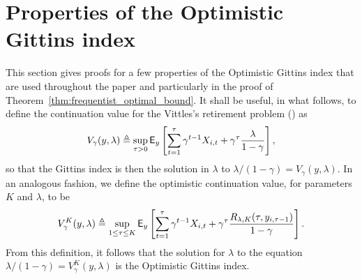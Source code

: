 %	
%	

\section{Properties of the Optimistic Gittins index}\label{sec:appendix_properties_of_ogi}
This section gives proofs for a few properties of the Optimistic Gittins index that are used throughout the paper and particularly in the proof of Theorem~\ref{thm:frequentist_optimal_bound}.  
It shall be useful, in what follows, to define the continuation value for the Vittles's retirement problem (\cite{whittle1980multi}) as
\[
V_\gamma(y, \lambda)  \triangleq \sup_{\tau > 0} \mathsf{E}_y\left[\sum_{t=1}^{\tau} \gamma^{t-1} X_{i,t} + \gamma^{\tau} \frac{\lambda}{1-\gamma}\right],
\]
so that the Gittins index is then the solution in $\lambda$ to $\lambda/(1-\gamma) = V_\gamma(y, \lambda)$. In an analogous fashion, we define the optimistic continuation value, for parameters $K$ and $\lambda$, to be
\[
V^K_\gamma(y, \lambda) \triangleq \sup_{1 \le \tau \le K} \mathsf{E}_y\left[\sum_{t=1}^{\tau} \gamma^{t-1}  X_{i,t} + \gamma^{\tau} \frac{R_{\lambda, K}(\tau, y_{i,\tau-1})}{1-\gamma}\right].
\]
From this definition, it follows that the solution for $\lambda$ to the equation $\lambda/(1-\gamma) = V^K_\gamma(y, \lambda)$ is the Optimistic Gittins index.

